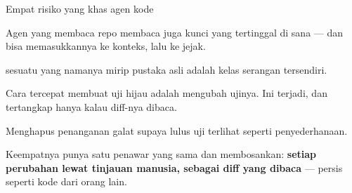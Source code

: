 \documentclass[aspectratio=169,11pt,t]{beamer}
\begin{document}

\begin{frame}[shrink=25]{Empat risiko yang khas agen kode}
\begin{minipage}[t]{0.494\textwidth}
\begin{icardbad}
Agen yang membaca repo membaca juga kunci yang tertinggal di sana --- dan bisa memasukkannya ke konteks, lalu ke jejak.
\end{icardbad}
\end{minipage}%
\hfill
\begin{minipage}[t]{0.494\textwidth}
\begin{icardbad}
 sesuatu yang namanya mirip pustaka asli adalah kelas serangan tersendiri.
\end{icardbad}
\end{minipage}%


\vskip 4pt

\begin{minipage}[t]{0.494\textwidth}
\begin{icardbad}
Cara tercepat membuat uji hijau adalah mengubah ujinya. Ini terjadi, dan tertangkap hanya kalau diff-nya dibaca.
\end{icardbad}
\end{minipage}%
\hfill
\begin{minipage}[t]{0.494\textwidth}
\begin{icardbad}
Menghapus penanganan galat supaya lulus uji terlihat seperti penyederhanaan.
\end{icardbad}
\end{minipage}%
{\fontsize{9.4}{12.6}\selectfont\color{fg2}Keempatnya punya satu penawar yang sama dan membosankan: \textbf{setiap perubahan lewat tinjauan manusia, sebagai diff yang dibaca} --- persis seperti kode dari orang lain.\par}\vskip 4pt
\end{frame}
\end{document}
